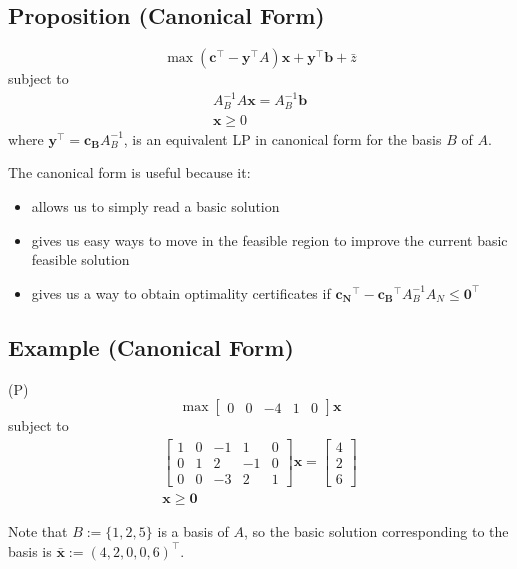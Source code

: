 \subsection{Proposition (Canonical Form)}
\[\max (\mathbf{c}^\top -\mathbf{y}^\top A)\mathbf{x}+\mathbf{y}^\top \mathbf{b}+\bar{z}\]
subject to
\begin{align*}
    A_B^{-1}A\mathbf{x}=A_B^{-1}\mathbf{b}\\
    \mathbf{x}\ge 0
\end{align*}
where $\mathbf{y}^\top =\mathbf{c_B}A_B^{-1}$, is an equivalent LP in canonical form for the 
basis $B$ of $A$.


The canonical form is useful because it:
\begin{itemize}
    \item allows us to simply read a basic solution
    \item gives us easy ways to move in the feasible region to improve the current basic
    feasible solution
    \item gives us a way to obtain optimality certificates if
    $\mathbf{c_N}^\top -\mathbf{c_B}^\top A_B^{-1}A_N\le \mathbf{0}^\top $
\end{itemize}

\subsection{Example (Canonical Form)}
(P)
\[\max \begin{bmatrix}
    0 & 0 & -4 & 1 & 0
\end{bmatrix}\mathbf{x}\]
subject to
\begin{align*}
    \begin{bmatrix}
        1 & 0 & -1 & 1 & 0\\
        0 & 1 & 2 & -1 & 0\\
        0 & 0 & -3 & 2 & 1
    \end{bmatrix}\mathbf{x}
    =
    \begin{bmatrix}
        4\\
        2\\
        6
    \end{bmatrix}\\
    \mathbf{x}\ge \mathbf{0}
\end{align*}


Note that $B:=\{1,2,5\}$ is a basis of $A$, so the basic solution corresponding to the
basis is
$\mathbf{\bar{x}}:=(4,2,0,0,6)^\top$.

